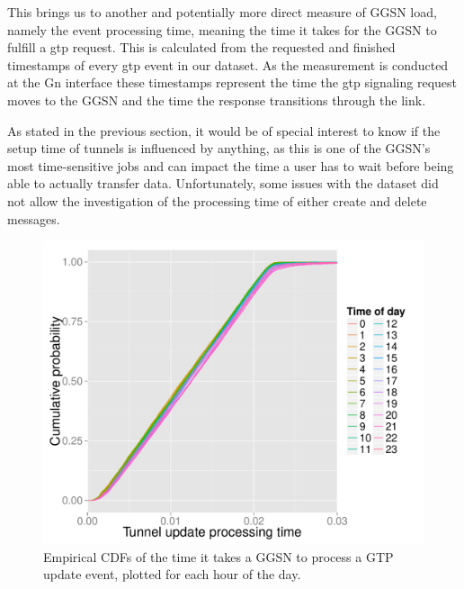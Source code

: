 This brings us to another and potentially more direct measure of \gls{GGSN} load, namely the event processing time, meaning the time it takes for the \gls{GGSN} to fulfill a \gls{gtp} request. This is calculated from the requested and finished timestamps of every \gls{gtp} event in our dataset. As the measurement is conducted at the Gn interface these timestamps represent the time the \gls{gtp} signaling request moves to the \gls{GGSN} and the time the response transitions through the link.

As stated in the previous section, it would be of special interest to know if the setup time of tunnels is influenced by anything, as this is one of the \gls{GGSN}'s most time-sensitive jobs and can impact the time a user has to wait before being able to actually transfer data. Unfortunately, some issues with the dataset did not allow the investigation of the processing time of either create and delete messages.

\begin{figure}[htb]
	\centering
	\includegraphics[width=1.0\textwidth]{images/R-update-time-cdfs.pdf}
	\caption{Empirical CDFs of the time it takes a GGSN to process a GTP update event, plotted for each hour of the day.}
	\label{c4:fig:update-time}
\end{figure}



